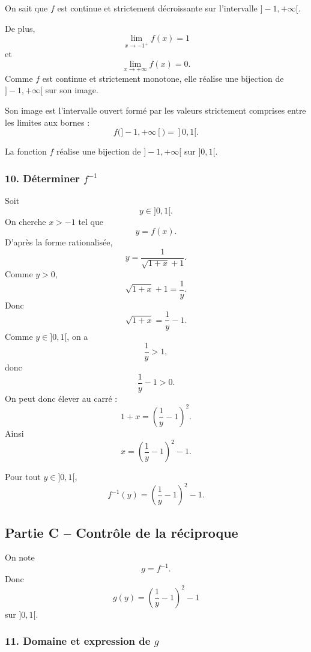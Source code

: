 \documentclass[11pt,a4paper]{article}
\begin{document}
On sait que \(f\) est continue et strictement décroissante sur l'intervalle \(]-1,+\infty[\).

De plus,
\[
\lim_{x\to -1^+}f(x)=1
\]
et
\[
\lim_{x\to+\infty}f(x)=0.
\]
Comme \(f\) est continue et strictement monotone, elle réalise une bijection de \(]-1,+\infty[\) sur son image.

Son image est l'intervalle ouvert formé par les valeurs strictement comprises entre les limites aux bornes :
\[
f(]-1,+\infty[)=]0,1[.
\]

\begin{resultatbox}
La fonction \(f\) réalise une bijection de \(]-1,+\infty[\) sur \(]0,1[\).
\end{resultatbox}


\subsubsection*{10. Déterminer \(f^{-1}\)}

Soit
\[
y\in]0,1[.
\]
On cherche \(x>-1\) tel que
\[
y=f(x).
\]
D'après la forme rationalisée,
\[
y=\frac1{\sqrt{1+x}+1}.
\]
Comme \(y>0\),
\[
\sqrt{1+x}+1=\frac1y.
\]
Donc
\[
\sqrt{1+x}=\frac1y-1.
\]
Comme \(y\in]0,1[\), on a
\[
\frac1y>1,
\]
donc
\[
\frac1y-1>0.
\]
On peut donc élever au carré :
\[
1+x=\left(\frac1y-1\right)^2.
\]
Ainsi
\[
x=\left(\frac1y-1\right)^2-1.
\]

\begin{resultatbox}
Pour tout \(y\in]0,1[\),
\[
f^{-1}(y)=\left(\frac1y-1\right)^2-1.
\]
\end{resultatbox}


\subsection*{Partie C -- Contrôle de la réciproque}

On note
\[
g=f^{-1}.
\]
Donc
\[
g(y)=\left(\frac1y-1\right)^2-1
\]
sur \(]0,1[\).


\subsubsection*{11. Domaine et expression de \(g\)}
\end{document}
